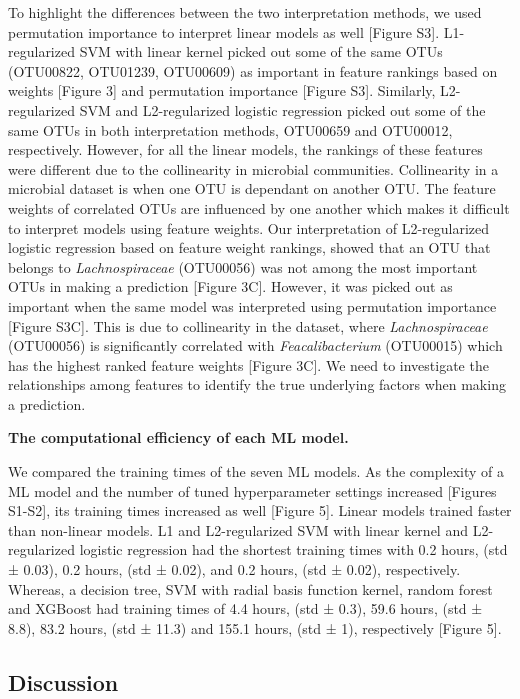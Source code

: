 \documentclass[11pt,]{article}
\begin{document}
To highlight the differences between the two interpretation methods, we
used permutation importance to interpret linear models as well {[}Figure
S3{]}. L1-regularized SVM with linear kernel picked out some of the same
OTUs (OTU00822, OTU01239, OTU00609) as important in feature rankings
based on weights {[}Figure 3{]} and permutation importance {[}Figure
S3{]}. Similarly, L2-regularized SVM and L2-regularized logistic
regression picked out some of the same OTUs in both interpretation
methods, OTU00659 and OTU00012, respectively. However, for all the
linear models, the rankings of these features were different due to the
collinearity in microbial communities. Collinearity in a microbial
dataset is when one OTU is dependant on another OTU. The feature weights
of correlated OTUs are influenced by one another which makes it
difficult to interpret models using feature weights. Our interpretation
of L2-regularized logistic regression based on feature weight rankings,
showed that an OTU that belongs to \emph{Lachnospiraceae} (OTU00056) was
not among the most important OTUs in making a prediction {[}Figure
3C{]}. However, it was picked out as important when the same model was
interpreted using permutation importance {[}Figure S3C{]}. This is due
to collinearity in the dataset, where \emph{Lachnospiraceae} (OTU00056)
is significantly correlated with \emph{Feacalibacterium} (OTU00015)
which has the highest ranked feature weights {[}Figure 3C{]}. We need to
investigate the relationships among features to identify the true
underlying factors when making a prediction.

\textbf{The computational efficiency of each ML model.}

We compared the training times of the seven ML models. As the complexity
of a ML model and the number of tuned hyperparameter settings increased
{[}Figures S1-S2{]}, its training times increased as well {[}Figure
5{]}. Linear models trained faster than non-linear models. L1 and
L2-regularized SVM with linear kernel and L2-regularized logistic
regression had the shortest training times with 0.2 hours, (std ± 0.03),
0.2 hours, (std ± 0.02), and 0.2 hours, (std ± 0.02), respectively.
Whereas, a decision tree, SVM with radial basis function kernel, random
forest and XGBoost had training times of 4.4 hours, (std ± 0.3), 59.6
hours, (std ± 8.8), 83.2 hours, (std ± 11.3) and 155.1 hours, (std ± 1),
respectively {[}Figure 5{]}.

\subsection{Discussion}\label{discussion}
\end{document}
